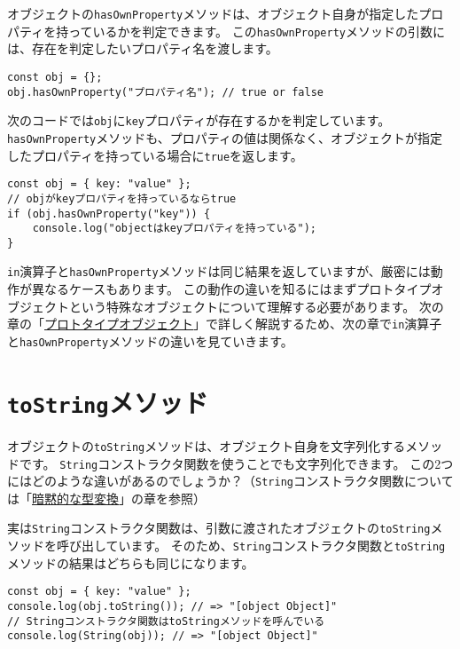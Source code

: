 オブジェクトの\texttt{hasOwnProperty}メソッドは、オブジェクト自身が指定したプロパティを持っているかを判定できます。
この\texttt{hasOwnProperty}メソッドの引数には、存在を判定したいプロパティ名を渡します。

\begin{lstlisting}
const obj = {};
obj.hasOwnProperty("プロパティ名"); // true or false
\end{lstlisting}

次のコードでは\texttt{obj}に\texttt{key}プロパティが存在するかを判定しています。
\texttt{hasOwnProperty}メソッドも、プロパティの値は関係なく、オブジェクトが指定したプロパティを持っている場合に\texttt{true}を返します。

\begin{lstlisting}
const obj = { key: "value" };
// objがkeyプロパティを持っているならtrue
if (obj.hasOwnProperty("key")) {
    console.log("objectはkeyプロパティを持っている");
}
\end{lstlisting}

\texttt{in}演算子と\texttt{hasOwnProperty}メソッドは同じ結果を返していますが、厳密には動作が異なるケースもあります。
この動作の違いを知るにはまずプロトタイプオブジェクトという特殊なオブジェクトについて理解する必要があります。
次の章の「\hyperlink{prototype-object}{プロトタイプオブジェクト}」で詳しく解説するため、次の章で\texttt{in}演算子と\texttt{hasOwnProperty}メソッドの違いを見ていきます。

\hypertarget{toString-method}{%
\section{\texorpdfstring{\texttt{toString}メソッド}{toStringメソッド}}\label{toString-method}}

オブジェクトの\texttt{toString}メソッドは、オブジェクト自身を文字列化するメソッドです。
\texttt{String}コンストラクタ関数を使うことでも文字列化できます。
この2つにはどのような違いがあるのでしょうか？（\texttt{String}コンストラクタ関数については「\hyperlink{implicit-coercion}{暗黙的な型変換}」の章を参照）

実は\texttt{String}コンストラクタ関数は、引数に渡されたオブジェクトの\texttt{toString}メソッドを呼び出しています。\enlargethispage{\baselineskip}
そのため、\texttt{String}コンストラクタ関数と\texttt{toString}メソッドの結果はどちらも同じになります。

\begin{lstlisting}
const obj = { key: "value" };
console.log(obj.toString()); // => "[object Object]"
// Stringコンストラクタ関数はtoStringメソッドを呼んでいる
console.log(String(obj)); // => "[object Object]"
\end{lstlisting}

